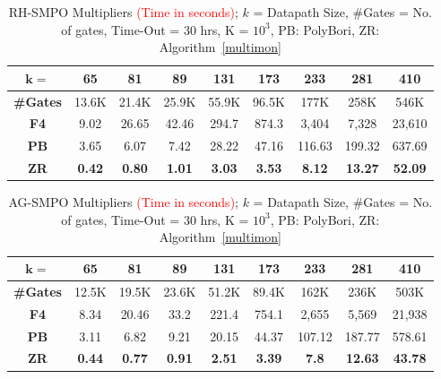 \begin{table}[H]
\centering
\caption{RH-SMPO Multipliers \textcolor{red}{(Time in seconds)}; $k$ = Datapath Size, \#Gates = No. of gates, Time-Out = 30 hrs, K = $10^3$,
PB: PolyBori, ZR: Algorithm~\ref{multimon}}
\label{rhsmpo}
\begin{tabular}{| c | c | c | c | c | c | c | c | c |} \hline
$\boldsymbol{k=}$&65&81&89&131&173&233&281&410 \\ \hline
\textbf{\#Gates} & 13.6K&21.4K & 25.9K& 55.9K &96.5K&177K&258K&546K\\ \hhline{|=|=|=|=|=|=|=|=|=|}
\textbf{F4\cite{pruss:tcad}} &9.02 &26.65 & 42.46&294.7&874.3&3,404&7,328&23,610 \\ \hline
\textbf{PB}  &3.65 &6.07 & 7.42&28.22 &47.16&116.63&199.32&637.69\\ \hline
\textbf{ZR}  & \textbf{0.42}& \textbf{0.80}&\textbf{1.01} & \textbf{3.03}&\textbf{3.53}&
\textbf{8.12}&\textbf{13.27}&\textbf{52.09}\\ \hline
\end{tabular}
\end{table}

\begin{table}[H]
\centering
\caption{AG-SMPO Multipliers \textcolor{red}{(Time in seconds)}; $k$ = Datapath Size, \#Gates = No. of gates, Time-Out = 30 hrs, K = $10^3$,
PB: PolyBori, ZR: Algorithm~\ref{multimon}}
\label{agsmpo}
\begin{tabular}{| c | c | c | c | c | c | c | c | c |} \hline
$\boldsymbol{k=}$&65&81&89&131&173&233&281&410 \\ \hline
\textbf{\#Gates} &12.5K & 19.5K&23.6K&51.2K&89.4K&162K&236K&503K \\ \hhline{|=|=|=|=|=|=|=|=|=|}
\textbf{F4\cite{pruss:tcad}} &8.34 &20.46 &33.2&221.4&754.1&2,655&5,569&21,938\\ \hline
\textbf{PB} &3.11 & 6.82& 9.21& 20.15&44.37&107.12&187.77&578.61\\ \hline
\textbf{ZR} &\textbf{0.44} &\textbf{0.77} &\textbf{0.91}& \textbf{2.51}&\textbf{3.39}&
\textbf{7.8}&\textbf{12.63}&\textbf{43.78}\\ \hline
\end{tabular}
\end{table}

